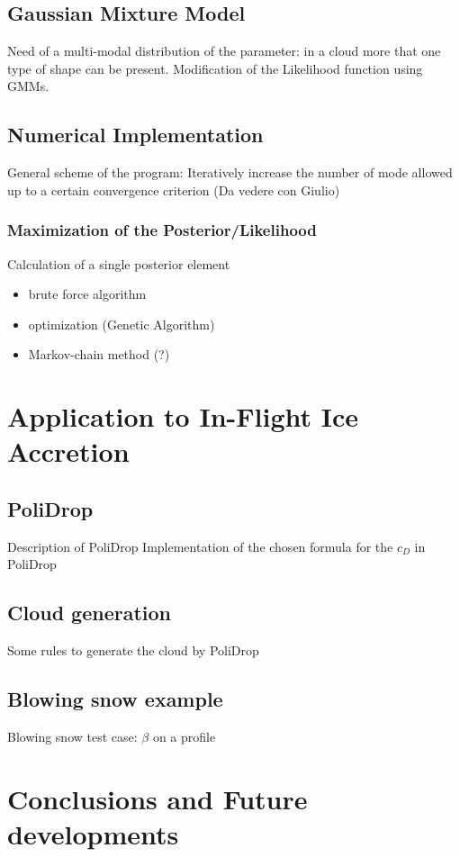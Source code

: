 \documentclass[a4paper,12pt,twoside,titlepage,openright]{book}
\begin{document}
	\section{Gaussian Mixture Model}
	\label{sec: GMM}
		Need of a multi-modal distribution of the parameter: in a cloud more that one type of shape can be present. Modification of the Likelihood function using GMMs.
		
	\section{Numerical Implementation}
	\label{sec: numericalImplementation}
		General scheme of the program: Iteratively increase the number of mode allowed up to a certain convergence criterion (Da vedere con Giulio)
	
	\subsection{Maximization of the Posterior/Likelihood}
	\label{sec: algorithm}
		Calculation of a single posterior element
		\begin{itemize}
			\item brute force algorithm
			\item optimization (Genetic Algorithm)
			\item Markov-chain method (?)
		\end{itemize}
	
	
	
\chapter{Application to In-Flight Ice Accretion}
\label{ch: Application}
	\section{PoliDrop}
	Description of PoliDrop
	Implementation of the chosen formula for the $ c_D $ in PoliDrop
	
	\section{Cloud generation}
		Some rules to generate the cloud by PoliDrop
		
	\section{Blowing snow example}
		Blowing snow test case: $\beta$ on a profile


\chapter{Conclusions and Future developments}
\label{ch: Conclusion}
	
\printbibliography[heading=bibintoc]
\end{document}
